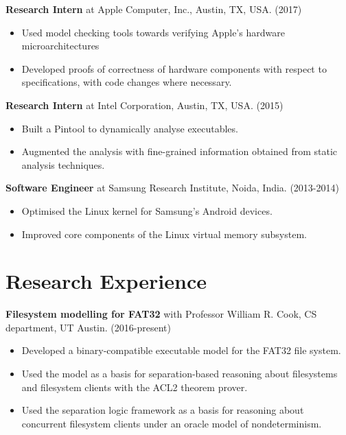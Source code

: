 \documentclass[margin]{res}
\begin{document}
\begin{resume}
 {\bf Research Intern} at Apple Computer, Inc., Austin, TX,
 USA. \hfill (2017)
 \begin{itemize} \itemsep -2pt  %
 \item Used model checking tools towards verifying Apple's hardware microarchitectures
 \item Developed proofs of correctness of hardware components with
   respect to specifications, with code changes where necessary.
 \end{itemize}

 {\bf Research Intern} at Intel Corporation, Austin, TX, USA. \hfill
 (2015)
 \begin{itemize} \itemsep -2pt  %
 \item Built a Pintool to dynamically analyse executables.
 \item Augmented
   the analysis with fine-grained information obtained from static
   analysis techniques.
 \end{itemize}

 {\bf Software Engineer} at Samsung Research Institute, Noida, India. \hfill (2013-2014)
 \begin{itemize} \itemsep -2pt  %
 \item Optimised the Linux kernel for Samsung's
   Android devices.
 \item Improved core components of the Linux virtual memory subsystem.
 \end{itemize}

\section{Research Experience}

 {\bf Filesystem modelling for FAT32} with Professor William R. Cook, CS department, UT Austin. \hfill (2016-present)
 \begin{itemize} \itemsep -2pt  %
 \item Developed a binary-compatible executable model for the FAT32 file system.
 \item Used the model as a basis for separation-based reasoning about
   filesystems and filesystem clients with the ACL2 theorem prover.
 \item Used the separation logic framework as a basis for reasoning
   about concurrent filesystem clients under an oracle model of
   nondeterminism.
 \end{itemize}


\end{resume}
\end{document}
